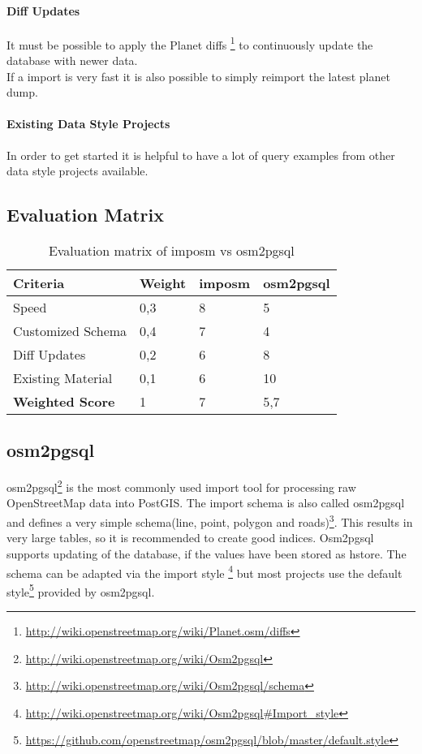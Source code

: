 \paragraph{Diff Updates}
It must be possible to apply the Planet diffs \footnote{\url{http://wiki.openstreetmap.org/wiki/Planet.osm/diffs}} 
to continuously update the database with newer data.
\\
If a import is very fast it is also possible to simply reimport the latest
planet dump.

\paragraph{Existing Data Style Projects}
In order to get started it is helpful to have a lot of query examples
from other data style projects available.

\subsection{Evaluation Matrix}\label{evaluation_matrix}

\begin{table}[H]
    \begin{tabular}{llll}
    \hline
    Criteria         & Weight & imposm & osm2pgsql \\
    \hline
    Speed             & 0,3    & 8      & 5         \\
    Customized Schema & 0,4    & 7      & 4         \\
    Diff Updates      & 0,2    & 6      & 8         \\
    Existing Material & 0,1    & 6      & 10        \\
    \hline
    \textbf{Weighted Score} & 1      & 7      & 5,7       \\
    \end{tabular}
    \caption{Evaluation matrix of imposm vs osm2pgsql}
\end{table}


\subsection{osm2pgsql}\label{osm2pgsql_importer}

osm2pgsql\footnote{\url{http://wiki.openstreetmap.org/wiki/Osm2pgsql}} is the
most commonly used import tool for processing raw OpenStreetMap data into PostGIS.
The import schema is also called osm2pgsql and defines a very
simple schema(line, point, polygon and
roads)\footnote{\url{http://wiki.openstreetmap.org/wiki/Osm2pgsql/schema}}.
This results in very large tables, so it is recommended to create good
indices. Osm2pgsql supports updating of the database, if the values have
been stored as hstore. The schema can be adapted via the import style \footnote{\url{http://wiki.openstreetmap.org/wiki/Osm2pgsql\#Import_style}}
but most projects use the default style\footnote{\url{https://github.com/openstreetmap/osm2pgsql/blob/master/default.style}} provided by osm2pgsql.

